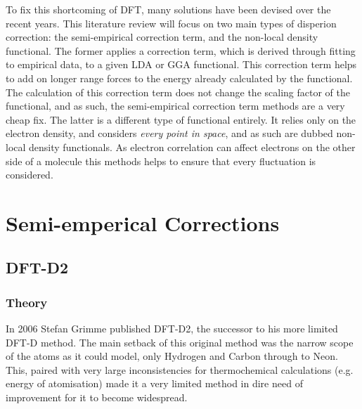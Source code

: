 \documentclass[10pt,a4paper,twocolumn,twoside]{extarticle}
\begin{document}
	To fix this shortcoming of DFT, many solutions have been devised over the recent years. This literature review will focus on two main types of disperion correction: the semi-empirical correction term, and the non-local density functional. The former applies a correction term, which is derived through fitting to empirical data, to a given LDA or GGA functional. This correction term helps to add on longer range forces to the energy already calculated by the functional. The calculation of this correction term does not change the scaling factor of the functional, and as such, the semi-empirical correction term methods are a very cheap fix. The latter is a different type of functional entirely. It relies only on the electron density, and considers \emph{every point in space}, and as such are dubbed non-local density functionals. As electron correlation can affect electrons on the other side of a molecule this methods helps to ensure that every fluctuation is considered.
	

	\section{Semi-emperical Corrections}
	\subsection{DFT-D2}
	\subsubsection{Theory}
	In 2006 Stefan Grimme published DFT-D2\cite{Grimme2006}, 
	the successor to his more limited DFT-D method. The main setback of this original method was the narrow scope of the atoms as it could model, only Hydrogen and Carbon through to Neon. This, paired with very large inconsistencies for thermochemical calculations (e.g. energy of atomisation) made it a very limited method in dire need of improvement for it to become widespread.
\end{document}

